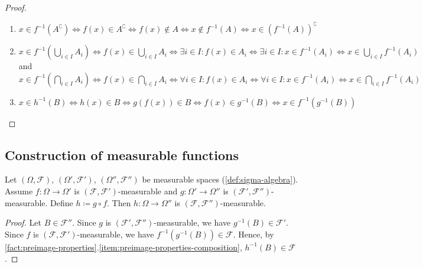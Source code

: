 \begin{proof}
\begin{enumerate}[label=(\roman*)]
\item 
$
x \in f^{-1}(A^{\complement})
\Leftrightarrow
f(x) \in A^{\complement}
\Leftrightarrow
f(x) \notin A
\Leftrightarrow
x \notin f^{-1}(A)
\Leftrightarrow
x \in (f^{-1}(A))^{\complement}
$
\item
\begingroup
{\fontsize{7}{10}\selectfont
$
x \in f^{-1}\left(\bigcup\limits_{i \in I} A_i\right)
\Leftrightarrow
f(x) \in \bigcup\limits_{i \in I} A_i
\Leftrightarrow
\exists i \in I : f(x) \in A_i
\Leftrightarrow
\exists i \in I : x \in f^{-1}(A_i)
\Leftrightarrow
x \in \bigcup\limits_{i \in I} f^{-1}(A_i)
$
}
\endgroup
\\
and\\
\begingroup
{\fontsize{7}{10}\selectfont
$
x \in f^{-1}\left(\bigcap\limits_{i \in I} A_i\right)
\Leftrightarrow
f(x) \in \bigcap\limits_{i \in I} A_i
\Leftrightarrow
\forall i \in I : f(x) \in A_i
\Leftrightarrow
\forall i \in I : x \in f^{-1}(A_i)
\Leftrightarrow
x \in \bigcap\limits_{i \in I} f^{-1}(A_i)
$
}
\endgroup
\item
$
x \in h^{-1}(B)
\Leftrightarrow
h(x) \in B
\Leftrightarrow
g(f(x)) \in B
\Leftrightarrow
f(x) \in g^{-1}(B)
\Leftrightarrow
x \in f^{-1}(g^{-1}(B))
$
\qedhere
\end{enumerate}
\end{proof}





\subsection{Construction of measurable functions}



\begin{theorem}\label{thm:composition-of-measurable-functions}  %
Let 
$(\Omega,\mathcal{F})$, $(\Omega',\mathcal{F}')$, $(\Omega'',\mathcal{F}'')$ be measurable spaces (\autoref{def:sigma-algebra}). 
Assume 
$f : \Omega \to \Omega'$ is $(\mathcal{F},\mathcal{F}')$-measurable
and 
$g : \Omega' \to \Omega''$ is $(\mathcal{F}',\mathcal{F}'')$-measurable.
Define $h \coloneq g \circ f$.
Then $h : \Omega \to \Omega''$ is $(\mathcal{F},\mathcal{F}'')$-measurable.
\end{theorem}
\begin{proof}
Let $B \in \mathcal{F}''$.
Since $g$ is $(\mathcal{F}',\mathcal{F}'')$-measurable, we have $g^{-1}(B) \in \mathcal{F}'$.
Since $f$ is $(\mathcal{F},\mathcal{F}')$-measurable, we have $f^{-1}(g^{-1}(B)) \in \mathcal{F}$.
Hence, by \autoref{fact:preimage-properties}.\ref{item:preimage-properties-composition}, $h^{-1}(B) \in \mathcal{F}$.
\end{proof}


